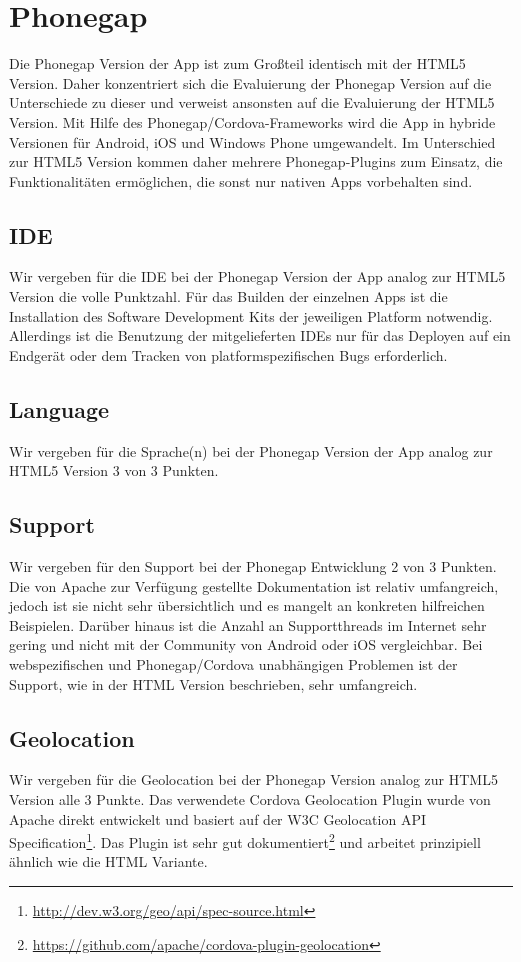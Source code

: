 \section{Phonegap}
Die Phonegap Version der App ist zum Großteil identisch mit der HTML5 Version. Daher konzentriert sich die Evaluierung der Phonegap Version auf die Unterschiede zu dieser und verweist ansonsten auf die Evaluierung der HTML5 Version. Mit Hilfe des Phonegap/Cordova-Frameworks wird die App in hybride Versionen für Android, iOS und Windows Phone umgewandelt. Im Unterschied zur HTML5 Version kommen daher mehrere Phonegap-Plugins zum Einsatz, die Funktionalitäten ermöglichen, die sonst nur nativen Apps vorbehalten sind.

\subsection{IDE}
Wir vergeben für die IDE bei der Phonegap Version der App analog zur HTML5 Version die volle Punktzahl. Für das Builden der einzelnen Apps ist die Installation des Software Development Kits der jeweiligen Platform notwendig. Allerdings ist die Benutzung der mitgelieferten IDEs nur für das Deployen auf ein Endgerät oder dem Tracken von platformspezifischen Bugs erforderlich.

\subsection{Language}
Wir vergeben für die Sprache(n) bei der Phonegap Version der App analog zur HTML5 Version 3 von 3 Punkten.

\subsection{Support}
Wir vergeben für den Support bei der Phonegap Entwicklung 2 von 3 Punkten. Die von Apache zur Verfügung gestellte Dokumentation ist relativ umfangreich, jedoch ist sie nicht sehr übersichtlich und es mangelt an konkreten hilfreichen Beispielen. Darüber hinaus ist die Anzahl an Supportthreads im Internet sehr gering und nicht mit der Community von Android oder iOS vergleichbar. Bei webspezifischen und Phonegap/Cordova unabhängigen Problemen ist der Support, wie in der  HTML Version beschrieben, sehr umfangreich.

\subsection{Geolocation}
Wir vergeben für die Geolocation bei der Phonegap Version analog zur HTML5 Version alle 3 Punkte. Das verwendete Cordova Geolocation Plugin wurde von Apache direkt entwickelt und basiert auf der W3C Geolocation API Specification\footnote{\url{http://dev.w3.org/geo/api/spec-source.html}}. Das Plugin ist sehr gut dokumentiert\footnote{\url{https://github.com/apache/cordova-plugin-geolocation}} und arbeitet prinzipiell ähnlich wie die HTML Variante.

